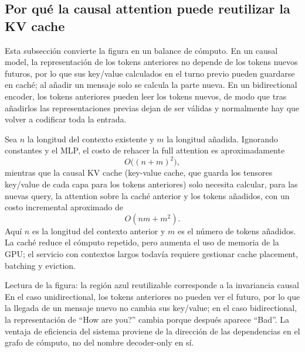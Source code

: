 

\subsection{Por qué la causal attention puede reutilizar la KV cache}

Esta subsección convierte la figura en un balance de cómputo. En un causal model, la representación de los tokens anteriores no depende de los tokens nuevos futuros, por lo que sus key/value calculados en el turno previo pueden guardarse en caché; al añadir un mensaje solo se calcula la parte nueva. En un bidirectional encoder, los tokens anteriores pueden leer los tokens nuevos, de modo que tras añadirlos las representaciones previas dejan de ser válidas y normalmente hay que volver a codificar toda la entrada.


Sea $n$ la longitud del contexto existente y $m$ la longitud añadida. Ignorando constantes y el MLP, el costo de rehacer la full attention es aproximadamente
\[
O\bigl((n+m)^2\bigr),
\]
mientras que la causal KV cache (key-value cache, que guarda los tensores key/value de cada capa para los tokens anteriores) solo necesita calcular, para las nuevas query, la attention sobre la caché anterior y los tokens añadidos, con un costo incremental aproximado de
\[
O(nm+m^2).
\]
Aquí $n$ es la longitud del contexto anterior y $m$ es el número de tokens añadidos. La caché reduce el cómputo repetido, pero aumenta el uso de memoria de la GPU; el servicio con contextos largos todavía requiere gestionar cache placement, batching y eviction.

\begin{knowledgebox}{Lectura de la figura: la región azul reutilizable corresponde a la invariancia causal}
En el caso unidirectional, los tokens anteriores no pueden ver el futuro, por lo que la llegada de un mensaje nuevo no cambia sus key/value; en el caso bidirectional, la representación de ``How are you?'' cambia porque después aparece ``Bad''. La ventaja de eficiencia del sistema proviene de la dirección de las dependencias en el grafo de cómputo, no del nombre decoder-only en sí.
\end{knowledgebox}

